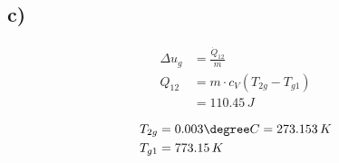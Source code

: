 

\subsection*{c)}
\begin{align*}
    \Delta u_{g} &= \frac{\dot{Q}_{12}}{m} \\
    Q_{12} &= m \cdot c_V (T_{2g} - T_{g1}) \\
    &= 110.45 \, J
\end{align*}

\begin{align*}
    T_{2g} &= 0.003 \degree C = 273.153 \, K \\
    T_{g1} &= 773.15 \, K
\end{align*}